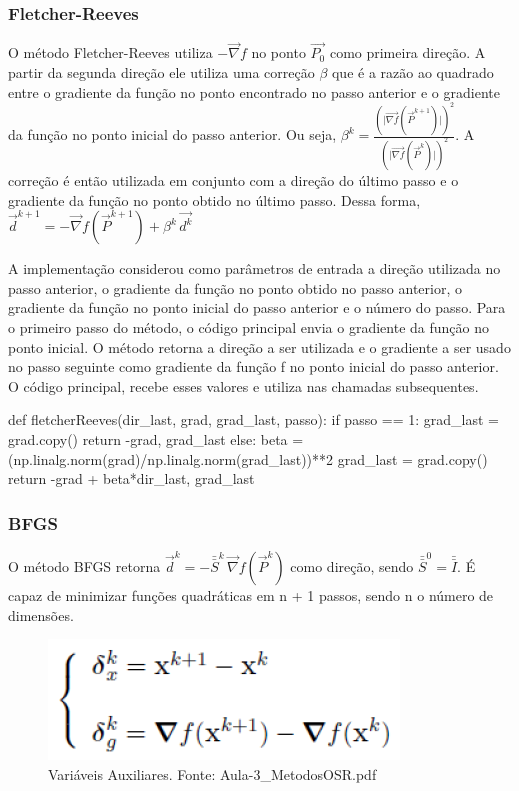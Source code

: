 \documentclass[10pt, a4paper]{article}
\begin{document}
\subsubsection{Fletcher-Reeves}
O método Fletcher-Reeves utiliza $-\overrightarrow{\nabla}f$ no ponto $\overrightarrow{P_0}$ como primeira direção. A partir da segunda direção
ele utiliza uma correção $\beta$ que é a razão ao quadrado entre o gradiente da função no ponto encontrado no passo anterior e o gradiente da função no ponto
inicial do passo anterior. Ou seja, $\beta^k = \frac{(\lvert\overrightarrow{\nabla f}(\overrightarrow{P}^{k+1})\rvert)^2}{(\lvert\overrightarrow{\nabla f}(\overrightarrow{P}^k)\rvert)^2}$.
A correção é então utilizada em conjunto com a direção do último passo e o gradiente da função no ponto obtido no último passo. Dessa forma,
$\overrightarrow{d}^{k+1} = -\overrightarrow{\nabla}f(\overrightarrow{P}^{k+1}) + \beta^k\,\overrightarrow{d^k}$

A implementação considerou como parâmetros de entrada a direção utilizada no passo anterior, o gradiente da função no ponto obtido no passo anterior, o gradiente 
da função no ponto inicial do passo anterior e o número do passo. Para o primeiro passo do método, o código principal envia o gradiente da função no ponto inicial.
O método retorna a direção a ser utilizada e o gradiente a ser usado no passo seguinte como gradiente da função f no ponto inicial do passo anterior. O código principal,
recebe esses valores e utiliza nas chamadas subsequentes.

\begin{python}
 def fletcherReeves(dir_last, grad, grad_last, passo):
    if passo == 1:
        grad_last = grad.copy()
        return -grad, grad_last
    else:
        beta = (np.linalg.norm(grad)/np.linalg.norm(grad_last))**2
        grad_last = grad.copy()
        return -grad + beta*dir_last, grad_last
\end{python}

\subsubsection{BFGS}

O método BFGS retorna $\overrightarrow{d}^k = -\bar{\bar{S}}^k\,\overrightarrow{\nabla}f(\overrightarrow{P}^k)$ como direção, sendo $\bar{\bar{S}}^0 = \bar{\bar{I}}$.
É capaz de minimizar funções quadráticas em n + 1 passos, sendo n o número de dimensões.

\begin{figure}[htpb]
  \centering
  \includegraphics[scale=0.5]{bfgs_auxiliares.PNG}
  \caption{Variáveis Auxiliares. Fonte: Aula-3\_MetodosOSR.pdf}
\end{figure}
\end{document}
